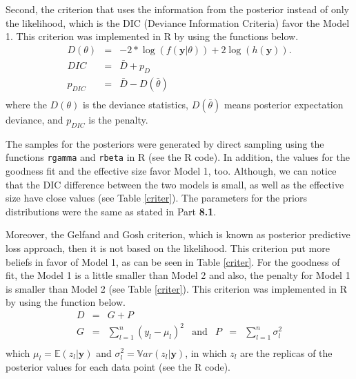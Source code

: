 \documentclass[a4paper, 11pt]{article}
\begin{document}
Second, the criterion that uses the information from the posterior instead of only the likelihood, which is the DIC (Deviance Information Criteria) favor the Model 1. This criterion was implemented in R by using the functions below. 
\begin{equation*}
\begin{array}{lclll}
D(\theta) & = &  -2*\log(f(\textbf{y}|\theta)) + 2\log(h(\textbf{y})).\\

DIC & = & \bar{D} + p_{D}\\

p_{DIC} & = & \bar{D} - D(\bar{\theta}) \\ 
\end{array}
\end{equation*}
\noindent 
where the $D(\theta)$ is the deviance statistics, $D(\bar{\theta})$ means posterior expectation deviance, and $p_{DIC}$ is the penalty.

The samples for the posteriors were generated by direct sampling using the functions \texttt{rgamma} and \texttt{rbeta} in R (see the R code). In addition, the values for the goodness fit and the effective size favor Model 1, too. Although, we can notice that the DIC difference between the two models is small, as well as the effective size have close values (see Table \ref{criter}). The parameters for the priors distributions were the same as stated in Part \textbf{8.1}.

Moreover, the Gelfand and Gosh criterion, which is known as posterior predictive loss approach, then it is not based on the likelihood. This criterion put more beliefs in favor of Model 1, as can be seen in Table \ref{criter}. For the goodness of fit, the Model 1 is a little smaller than Model 2 and also, the penalty for Model 1 is smaller than Model 2 (see Table \ref{criter}).
This criterion was implemented in R by using the function below. 
\begin{equation*}
\begin{array}{lclllll}
D & = & G + P\\

G & = & \displaystyle\sum_{l=1}^{n}(y_l - \mu_l)^2 & \mbox{and} & P & = & \displaystyle\sum_{l=1}^{n} \sigma^2_l\\
\end{array}
\end{equation*} 
\noindent
which $\mu_l = \mathds{E}(z_l|\textbf{y})$ and $\sigma_l^2 =  \mathds{V}ar(z_l|\textbf{y})$, in which $z_l$ are the replicas of the posterior values for each data point (see the R code).
\end{document}
